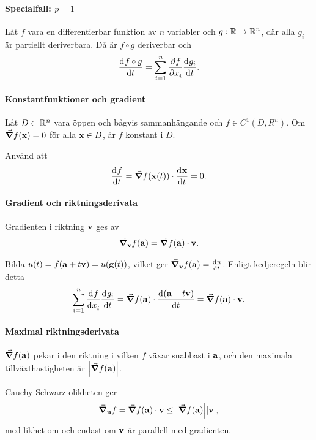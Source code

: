 \paragraph{Specialfall: $p = 1$}
Låt $f$ vara en differentierbar funktion av $n$ variabler och $g: \mathbb{R}\to\mathbb{R}^n$, där alla $g_i$ är partiellt deriverbara. Då är $f\circ g$ deriverbar och
\begin{align*}
	\dv[]{f\circ g}{t} (t) = \sum\limits_{i = 1}^{n}\pdv[]{f}{x_i} (g(t))\dv[]{g_i}{t} (t).
\end{align*}

\proof

\paragraph{Konstantfunktioner och gradient}
Låt $D\subset\mathbb{R}^n$ vara öppen och bågvis sammanhängande och $f\in C^1(D, R^n)$. Om $\grad{f(\vect{x})} = 0$ för alla $\vect{x}\in D$, är $f$ konstant i $D$.

\proof
Använd att
\begin{align*}
	\deval{f}{t}{\vect{x}(t)} = \grad{f(\vect{x}(t))}\cdot\deval{\vect{x}}{t}{t} = 0.
\end{align*}

\paragraph{Gradient och riktningsderivata}
Gradienten i riktning $\vect{v}$ ges av
\begin{align*}
	\grad_{\vect{v}}f(\vect{a}) = \grad{f}(\vect{a})\cdot\vect{v}.
\end{align*}

\proof
Bilda $u(t) = f(\vect{a} + t\vect{v}) = u(\vect{g}(t))$, vilket ger $\grad_{\vect{v}}f(\vect{a}) = \deval{u}{t}{0}$. Enligt kedjeregeln blir detta
\begin{align*}
	\sum\limits_{i = 1}^{n}\deval{f}{x_i}{0}\deval{g_i}{t}{0} = \grad{f}(\vect{a})\cdot\deval{(\vect{a} + t\vect{v})}{t}{0} = \grad{f}(\vect{a})\cdot\vect{v}.
\end{align*}

\paragraph{Maximal riktningsderivata}
$\grad{f(\vect{a})}$ pekar i den riktning i vilken $f$ växar snabbast i $\vect{a}$, och den maximala tillväxthastigheten är $\abs{\grad{f(\vect{a})}}$.

\proof
Cauchy-Schwarz-olikheten ger
\begin{align*}
	\grad_{\vect{u}}f = \grad{f}(\vect{a})\cdot\vect{v}\leq\abs{\grad{f}(\vect{a})}\abs{\vect{v}},
\end{align*}
med likhet om och endast om $\vect{v}$ är parallell med gradienten.

